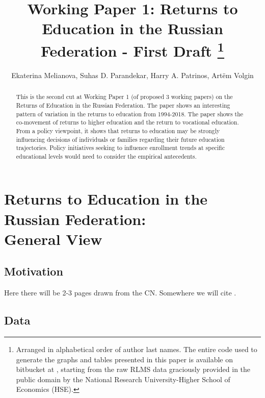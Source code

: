 \documentclass[12pt,a4paper]{article}
\numberwithin{equation}{section}
\begin{document}
\title{Working Paper 1: Returns to Education in the Russian Federation - First Draft \footnote{Arranged in alphabetical order of author last names. The entire code used to generate the graphs and tables presented in this paper is available on bitbucket at  , starting from the raw RLMS data graciously provided in the public domain by the National Research University-Higher School of Economics (HSE).}}
\author{Ekaterina Melianova, Suhas D. Parandekar, Harry A. Patrinos, Art\"{e}m Volgin}
\maketitle

\begin{abstract}
This is the second cut at Working Paper 1 (of proposed 3 working papers) on the Returns of Education in the Russian Federation. The paper shows an interesting pattern of variation in the returns to education from 1994-2018. The paper shows the co-movement of returns to higher education and the return to vocational education. From a policy viewpoint, it shows that returns to education may be strongly influencing decisions of individuals or families regarding their future education trajectories. Policy initiatives seeking to influence enrollment trends at specific educational levels would need to consider the empirical antecedents. 
\end{abstract}


\section{Returns to Education in the Russian Federation: \\ General View}

\subsection{Motivation}

Here there will be 2-3 pages drawn from the CN.
Somewhere we will cite \parencite{mincer_082._1974}. 

\subsection{Data}
\end{document}
